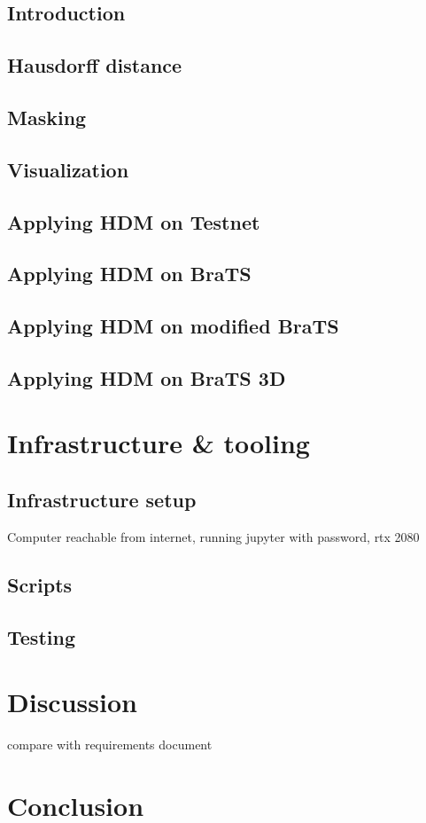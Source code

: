 \section{Introduction}
\section{Hausdorff distance}
\section{Masking}
\section{Visualization}
\section{Applying HDM on Testnet}
\section{Applying HDM on BraTS}
\section{Applying HDM on modified BraTS}
\section{Applying HDM on BraTS 3D}

\chapter{Infrastructure \& tooling}
\section{Infrastructure setup}
Computer reachable from internet, running jupyter with password,
rtx 2080

\section{Scripts}

\section{Testing}


\chapter{Discussion}
compare with requirements document

\chapter{Conclusion}